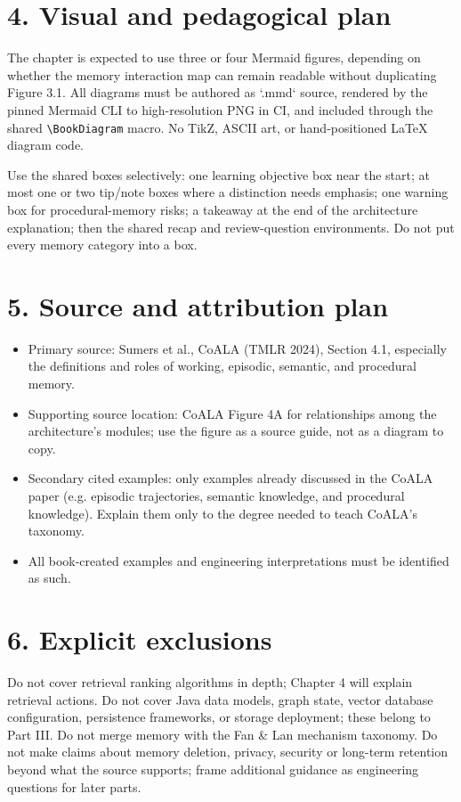\section*{4. Visual and pedagogical plan}
The chapter is expected to use three or four Mermaid figures, depending on whether the memory interaction map can remain readable without duplicating Figure 3.1. All diagrams must be authored as `.mmd` source, rendered by the pinned Mermaid CLI to high-resolution PNG in CI, and included through the shared \verb|\BookDiagram| macro. No TikZ, ASCII art, or hand-positioned LaTeX diagram code.

Use the shared boxes selectively: one learning objective box near the start; at most one or two tip/note boxes where a distinction needs emphasis; one warning box for procedural-memory risks; a takeaway at the end of the architecture explanation; then the shared recap and review-question environments. Do not put every memory category into a box.

\section*{5. Source and attribution plan}
\begin{itemize}
  \item Primary source: Sumers et al., CoALA (TMLR 2024), Section 4.1, especially the definitions and roles of working, episodic, semantic, and procedural memory.
  \item Supporting source location: CoALA Figure 4A for relationships among the architecture's modules; use the figure as a source guide, not as a diagram to copy.
  \item Secondary cited examples: only examples already discussed in the CoALA paper (e.g. episodic trajectories, semantic knowledge, and procedural knowledge). Explain them only to the degree needed to teach CoALA's taxonomy.
  \item All book-created examples and engineering interpretations must be identified as such.
\end{itemize}

\section*{6. Explicit exclusions}
Do not cover retrieval ranking algorithms in depth; Chapter 4 will explain retrieval actions. Do not cover Java data models, graph state, vector database configuration, persistence frameworks, or storage deployment; these belong to Part III. Do not merge memory with the Fan \& Lan mechanism taxonomy. Do not make claims about memory deletion, privacy, security or long-term retention beyond what the source supports; frame additional guidance as engineering questions for later parts.

